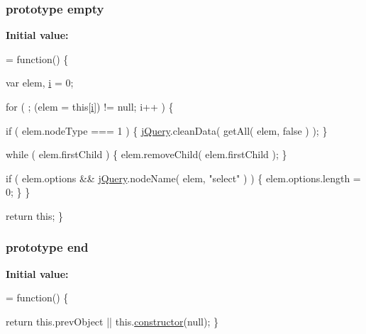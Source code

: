 \subsubsection[{empty}]{ {\bf prototype} empty}\label{jquery-1_810_82-vsdoc_8js_ad242f812bdc5013e0cbf15d6e4d6800a}
{\bfseries Initial value\+:}
\begin{DoxyCode}
= \textcolor{keyword}{function}() \{


        var elem,
            \hyperlink{_bibabook_2_scripts_2respond_8min_8js_a5e25b1d1bed9ab5f3174b76d6a722180}{i} = 0;

        \textcolor{keywordflow}{for} ( ; (elem = \textcolor{keyword}{this}[\hyperlink{_bibabook_2_scripts_2respond_8min_8js_a5e25b1d1bed9ab5f3174b76d6a722180}{i}]) != null; i++ ) \{
            
            \textcolor{keywordflow}{if} ( elem.nodeType === 1 ) \{
                \hyperlink{jquery-1_810_82-vsdoc_8js_add5237586d970a38a81f990e8eb28c6c}{jQuery}.cleanData( getAll( elem, \textcolor{keyword}{false} ) );
            \}

            
            \textcolor{keywordflow}{while} ( elem.firstChild ) \{
                elem.removeChild( elem.firstChild );
            \}

            
            
            \textcolor{keywordflow}{if} ( elem.options && \hyperlink{jquery-1_810_82-vsdoc_8js_add5237586d970a38a81f990e8eb28c6c}{jQuery}.nodeName( elem, \textcolor{stringliteral}{"select"} ) ) \{
                elem.options.length = 0;
            \}
        \}

        \textcolor{keywordflow}{return} \textcolor{keyword}{this};
    \}
\end{DoxyCode}
\hypertarget{jquery-1_810_82-vsdoc_8js_af2ce7c86b4e6e9d61f85745258f4ef32}{}
\subsubsection[{end}]{ {\bf prototype} end}\label{jquery-1_810_82-vsdoc_8js_af2ce7c86b4e6e9d61f85745258f4ef32}
{\bfseries Initial value\+:}
\begin{DoxyCode}
= \textcolor{keyword}{function}() \{


        \textcolor{keywordflow}{return} this.prevObject || this.\hyperlink{jquery-1_810_82-vsdoc_8js_ac8c7ab4467fc25f40e85c72221a1f10b}{constructor}(null);
    \}
\end{DoxyCode}
\hypertarget{jquery-1_810_82-vsdoc_8js_a57adf3cfa88f689534e187b77491d52d}{}
